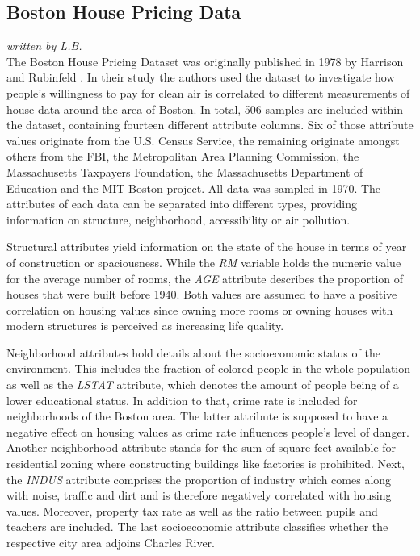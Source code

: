 \subsection{Boston House Pricing Data}
\textit{written by L.B.}\\

The Boston House Pricing Dataset was originally published in 1978 by Harrison and Rubinfeld \cite{hedonichousepricing}. In their study the authors used the dataset to investigate how people's willingness to pay for clean air is correlated to different measurements of house data around the area of Boston.
In total, 506 samples are included within the dataset, containing fourteen different attribute columns. Six of those attribute values originate from the U.S. Census Service, the remaining originate amongst others from the FBI, the Metropolitan Area Planning Commission, the Massachusetts Taxpayers Foundation, the Massachusetts Department of Education and the MIT Boston project. All data was sampled in 1970. The attributes of each data can be separated into different types, providing information on structure, neighborhood, accessibility or air pollution.

Structural attributes yield information on the state of the house in terms of year of construction or spaciousness. While the \textit{RM} variable holds the numeric value for the average number of rooms, the \textit{AGE} attribute describes the proportion of houses that were built before 1940. Both values are assumed to have a positive correlation on housing values since owning more rooms or owning houses with modern structures is perceived as increasing life quality. 

Neighborhood attributes hold details about the socioeconomic status of the environment. This includes the fraction of colored people in the whole population as well as the \textit{LSTAT} attribute, which denotes the amount of people being of a lower educational status. In addition to that, crime rate is included for neighborhoods of the Boston area. The latter attribute is supposed to have a negative effect on housing values as crime rate influences people's level of danger. 
Another neighborhood attribute stands for the sum of square feet available for residential zoning where constructing buildings like factories is prohibited. Next, the \textit{INDUS} attribute comprises the proportion of industry which comes along with noise, traffic and dirt and is therefore negatively correlated with housing values. Moreover, property tax rate as well as the ratio between pupils and teachers are included. The last socioeconomic attribute classifies whether the respective city area adjoins Charles River.

